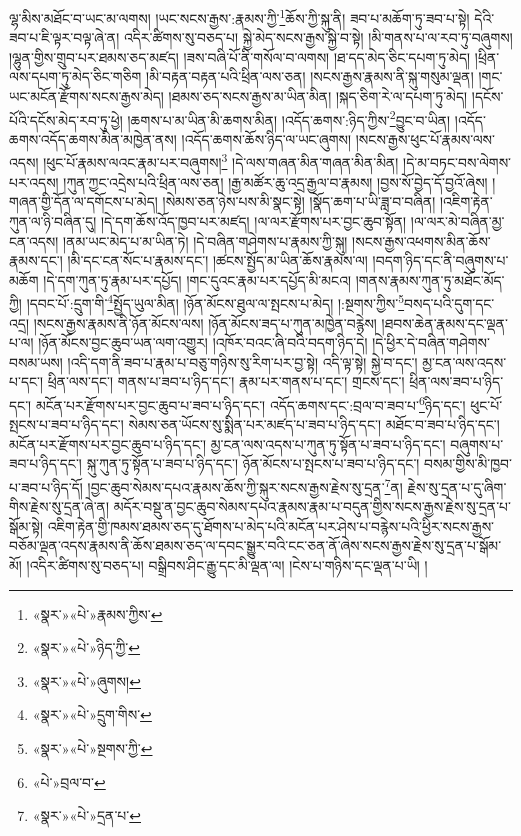 ལྷ་མིས་མཐོང་བ་ཡང་མ་ལགས། །ཡང་སངས་རྒྱས་:རྣམས་ཀྱི་\footnote{«སྣར་»«པེ་»རྣམས་ཀྱིས་}ཆོས་ཀྱི་སྐུ་ནི། ཟབ་པ་མཆོག་ཏུ་ཟབ་པ་སྟེ། དེའི་ཟབ་པ་ཇི་ལྟར་བལྟ་ཞེ་ན། འདིར་ཚིགས་སུ་བཅད་པ། སྐྱེ་མེད་སངས་རྒྱས་སྐྱེ་བ་སྟེ། །མི་གནས་པ་ལ་རབ་ཏུ་བཞུགས། །ལྷུན་གྱིས་གྲུབ་པར་ཐམས་ཅད་མཛད། །ཟས་བཞི་པོ་ནི་གསོལ་བ་ལགས། །ཐ་དད་མེད་ཅིང་དཔག་ཏུ་མེད། །ཕྲིན་ལས་དཔག་ཏུ་མེད་ཅིང་གཅིག །མི་བརྟན་བརྟན་པའི་ཕྲིན་ལས་ཅན། །སངས་རྒྱས་རྣམས་ནི་སྐུ་གསུམ་ལྡན། །གང་ཡང་མངོན་རྫོགས་སངས་རྒྱས་མེད། །ཐམས་ཅད་སངས་རྒྱས་མ་ཡིན་མིན། །སྐད་ཅིག་རེ་ལ་དཔག་ཏུ་མེད། །དངོས་པོའི་དངོས་མེད་རབ་ཏུ་ཕྱེ། །ཆགས་པ་མ་ཡིན་མི་ཆགས་མིན། །འདོད་ཆགས་:ཉིད་ཀྱིས་\footnote{«སྣར་»«པེ་»ཉིད་ཀྱི་}བྱུང་བ་ཡིན། །འདོད་ཆགས་འདོད་ཆགས་མིན་མཁྱེན་ནས། །འདོད་ཆགས་ཆོས་ཉིད་ལ་ཡང་ཞུགས། །སངས་རྒྱས་ཕུང་པོ་རྣམས་ལས་འདས། །ཕུང་པོ་རྣམས་ལའང་རྣམ་པར་བཞུགས།\footnote{«སྣར་»«པེ་»ཞུགས།} །དེ་ལས་གཞན་མིན་གཞན་མིན་མིན། །དེ་མ་བཏང་བས་ལེགས་པར་འདས། །ཀུན་ཀྱང་འདྲེས་པའི་ཕྲིན་ལས་ཅན། །རྒྱ་མཚོར་ཆུ་འདྲ་རྒྱལ་བ་རྣམས། །བྱས་སོ་བྱེད་དོ་བྱའོ་ཞེས། །གཞན་གྱི་དོན་ལ་དགོངས་པ་མེད། །སེམས་ཅན་ཉེས་པས་མི་སྣང་སྟེ། །སྣོད་ཆག་པ་ཡི་ཟླ་བ་བཞིན། །འཇིག་རྟེན་ཀུན་ལ་ཉི་བཞིན་དུ། །དེ་དག་ཆོས་འོད་ཁྱབ་པར་མཛད། །ལ་ལར་རྫོགས་པར་བྱང་ཆུབ་སྟོན། །ལ་ལར་མེ་བཞིན་མྱ་ངན་འདས། །ནམ་ཡང་མེད་པ་མ་ཡིན་ཏེ། །དེ་བཞིན་གཤེགས་པ་རྣམས་ཀྱི་སྐུ། །སངས་རྒྱས་འཕགས་མིན་ཆོས་རྣམས་དང་། །མི་དང་ངན་སོང་པ་རྣམས་དང་། །ཚངས་སྤྱོད་མ་ཡིན་ཆོས་རྣམས་ལ། །བདག་ཉིད་དང་ནི་བཞུགས་པ་མཆོག །དེ་དག་ཀུན་ཏུ་རྣམ་པར་དཔྱོད། །གང་དུའང་རྣམ་པར་དཔྱོད་མི་མངའ། །གནས་རྣམས་ཀུན་ཏུ་མཐོང་མོད་ཀྱི། །དབང་པོ་:དྲུག་གི་\footnote{«སྣར་»«པེ་»དྲུག་གིས་}སྤྱོད་ཡུལ་མིན། །ཉོན་མོངས་ཐུལ་ལ་སྤངས་པ་མེད། །:སྔགས་ཀྱིས་\footnote{«སྣར་»«པེ་»སྔགས་ཀྱི་}བསད་པའི་དུག་དང་འདྲ། །སངས་རྒྱས་རྣམས་ནི་ཉོན་མོངས་ལས། །ཉོན་མོངས་ཟད་པ་ཀུན་མཁྱེན་བརྙེས། །ཐབས་ཆེན་རྣམས་དང་ལྡན་པ་ལ། །ཉོན་མོངས་བྱང་ཆུབ་ཡན་ལག་འགྱུར། །འཁོར་བའང་ཞི་བའི་བདག་ཉིད་དེ། །དེ་ཕྱིར་དེ་བཞིན་གཤེགས་བསམ་ཡས། །འདི་དག་ནི་ཟབ་པ་རྣམ་པ་བཅུ་གཉིས་སུ་རིག་པར་བྱ་སྟེ། འདི་ལྟ་སྟེ། སྐྱེ་བ་དང་། མྱ་ངན་ལས་འདས་པ་དང་། ཕྲིན་ལས་དང་། གནས་པ་ཟབ་པ་ཉིད་དང་། རྣམ་པར་གནས་པ་དང་། གྲངས་དང་། ཕྲིན་ལས་ཟབ་པ་ཉིད་དང་། མངོན་པར་རྫོགས་པར་བྱང་ཆུབ་པ་ཟབ་པ་ཉིད་དང་། འདོད་ཆགས་དང་:བྲལ་བ་ཟབ་པ་\footnote{«པེ་»བྲལ་བ་}ཉིད་དང་། ཕུང་པོ་སྤངས་པ་ཟབ་པ་ཉིད་དང་། སེམས་ཅན་ཡོངས་སུ་སྨིན་པར་མཛད་པ་ཟབ་པ་ཉིད་དང་། མཐོང་བ་ཟབ་པ་ཉིད་དང་། མངོན་པར་རྫོགས་པར་བྱང་ཆུབ་པ་ཉིད་དང་། མྱ་ངན་ལས་འདས་པ་ཀུན་ཏུ་སྟོན་པ་ཟབ་པ་ཉིད་དང་། བཞུགས་པ་ཟབ་པ་ཉིད་དང་། སྐུ་ཀུན་ཏུ་སྟོན་པ་ཟབ་པ་ཉིད་དང་། ཉོན་མོངས་པ་སྤངས་པ་ཟབ་པ་ཉིད་དང་། བསམ་གྱིས་མི་ཁྱབ་པ་ཟབ་པ་ཉིད་དོ། །བྱང་ཆུབ་སེམས་དཔའ་རྣམས་ཆོས་ཀྱི་སྐུར་སངས་རྒྱས་རྗེས་སུ་དྲན་\footnote{«སྣར་»«པེ་»དྲན་པ་}ན། རྗེས་སུ་དྲན་པ་དུ་ཞིག་གིས་རྗེས་སུ་དྲན་ཞེ་ན། མདོར་བསྡུ་ན་བྱང་ཆུབ་སེམས་དཔའ་རྣམས་རྣམ་པ་བདུན་གྱིས་སངས་རྒྱས་རྗེས་སུ་དྲན་པ་སྒོམ་སྟེ། འཇིག་རྟེན་གྱི་ཁམས་ཐམས་ཅད་དུ་ཐོགས་པ་མེད་པའི་མངོན་པར་ཤེས་པ་བརྙེས་པའི་ཕྱིར་སངས་རྒྱས་བཅོམ་ལྡན་འདས་རྣམས་ནི་ཆོས་ཐམས་ཅད་ལ་དབང་སྒྱུར་བའི་ངང་ཅན་ནོ་ཞེས་སངས་རྒྱས་རྗེས་སུ་དྲན་པ་སྒོམ་མོ། །འདིར་ཚིགས་སུ་བཅད་པ། བསྒྲིབས་ཤིང་རྒྱུ་དང་མི་ལྡན་ལ། །ངེས་པ་གཉིས་དང་ལྡན་པ་ཡི། །
